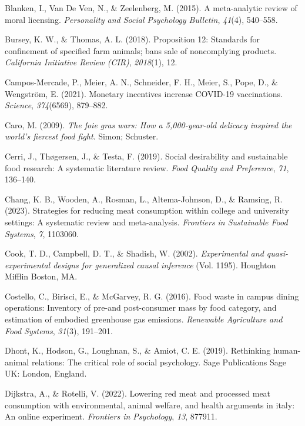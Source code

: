 \documentclass[
  man]{apa6}
\newlength{\cslhangindent}
\newenvironment{CSLReferences}[2] %
 {\begin{list}{}{%
  \setlength{\itemindent}{0pt}
  \setlength{\leftmargin}{0pt}
  \setlength{\parsep}{0pt}
  \ifodd #1
   \setlength{\leftmargin}{\cslhangindent}
   \setlength{\itemindent}{-1\cslhangindent}
  \fi
  \setlength{\itemsep}{#2\baselineskip}}}
 {\end{list}}
\begin{document}
\begin{CSLReferences}{1}{0}
Blanken, I., Van De Ven, N., \& Zeelenberg, M. (2015). A meta-analytic review of moral licensing. \emph{Personality and Social Psychology Bulletin}, \emph{41}(4), 540--558.

Bursey, K. W., \& Thomas, A. L. (2018). Proposition 12: Standards for confinement of specified farm animals; bans sale of noncomplying products. \emph{California Initiative Review (CIR)}, \emph{2018}(1), 12.

Campos-Mercade, P., Meier, A. N., Schneider, F. H., Meier, S., Pope, D., \& Wengström, E. (2021). Monetary incentives increase COVID-19 vaccinations. \emph{Science}, \emph{374}(6569), 879--882.

Caro, M. (2009). \emph{The foie gras wars: How a 5,000-year-old delicacy inspired the world's fiercest food fight}. Simon; Schuster.

Cerri, J., Thøgersen, J., \& Testa, F. (2019). Social desirability and sustainable food research: A systematic literature review. \emph{Food Quality and Preference}, \emph{71}, 136--140.

Chang, K. B., Wooden, A., Rosman, L., Altema-Johnson, D., \& Ramsing, R. (2023). Strategies for reducing meat consumption within college and university settings: A systematic review and meta-analysis. \emph{Frontiers in Sustainable Food Systems}, \emph{7}, 1103060.

Cook, T. D., Campbell, D. T., \& Shadish, W. (2002). \emph{Experimental and quasi-experimental designs for generalized causal inference} (Vol. 1195). Houghton Mifflin Boston, MA.

Costello, C., Birisci, E., \& McGarvey, R. G. (2016). Food waste in campus dining operations: Inventory of pre-and post-consumer mass by food category, and estimation of embodied greenhouse gas emissions. \emph{Renewable Agriculture and Food Systems}, \emph{31}(3), 191--201.

Dhont, K., Hodson, G., Loughnan, S., \& Amiot, C. E. (2019). Rethinking human-animal relations: The critical role of social psychology. Sage Publications Sage UK: London, England.

Dijkstra, A., \& Rotelli, V. (2022). Lowering red meat and processed meat consumption with environmental, animal welfare, and health arguments in italy: An online experiment. \emph{Frontiers in Psychology}, \emph{13}, 877911.


\end{CSLReferences}
\end{document}

